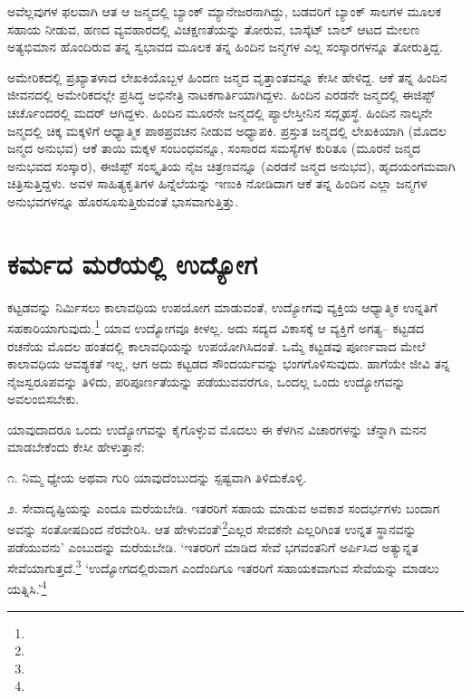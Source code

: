 ಅವೆಲ್ಲವುಗಳ ಫಲವಾಗಿ ಆತ ಆ ಜನ್ಮದಲ್ಲಿ ಬ್ಯಾಂಕ್ ಮ್ಯಾನೇಜರನಾಗಿದ್ದು, ಬಡವರಿಗೆ ಬ್ಯಾಂಕ್ ಸಾಲಗಳ ಮೂಲಕ ಸಹಾಯ ನೀಡುವ, ಹಣದ ವ್ಯವಹಾರದಲ್ಲಿ ವಿಚಕ್ಷಣತೆಯನ್ನು ತೋರುವ, ಬಾಸ್ಕೆಟ್ ಬಾಲ್ ಆಟದ ಮೇಲಣ ಅತ್ಯಭಿಮಾನ ಹೊಂದಿರುವ ತನ್ನ ಸ್ವಭಾವದ ಮೂಲಕ ತನ್ನ ಹಿಂದಿನ ಜನ್ಮಗಳ ಎಲ್ಲ ಸಂಸ್ಕಾರಗಳನ್ನೂ ತೋರುತ್ತಿದ್ದ.

ಅಮೇರಿಕದಲ್ಲಿ ಪ್ರಖ್ಯಾತಳಾದ ಲೇಖಕಿಯೊಬ್ಬಳ ಹಿಂದಣ ಜನ್ಮದ ವೃತ್ತಾಂತವನ್ನೂ ಕೇಸೀ ಹೇಳಿದ್ದ. ಆಕೆ ತನ್ನ ಹಿಂದಿನ ಜೀವನದಲ್ಲಿ ಅಮೇರಿಕದಲ್ಲೇ ಪ್ರಸಿದ್ಧ ಅಭಿನೇತ್ರಿ ನಾಟಕಗಾರ್ತಿಯಾಗಿದ್ದಳು. ಹಿಂದಿನ ಎರಡನೇ ಜನ್ಮದಲ್ಲಿ ಈಜಿಪ್ಟ್ ಚರ್ಚೊಂದರಲ್ಲಿ ಮದರ್ ಆಗಿದ್ದಳು. ಹಿಂದಿನ ಮೂರನೇ ಜನ್ಮದಲ್ಲಿ ಪ್ಯಾಲೇಸ್ತೀನಿನ ಸದ್ಗೃಹಸ್ಥೆ. ಹಿಂದಿನ ನಾಲ್ಕನೇ ಜನ್ಮದಲ್ಲಿ ಚಿಕ್ಕ ಮಕ್ಕಳಿಗೆ ಆಧ್ಯಾತ್ಮಿಕ ಪಾಠಪ್ರವಚನ ನೀಡುವ ಅಧ್ಯಾಪಕಿ. ಪ್ರಸ್ತುತ ಜನ್ಮದಲ್ಲಿ ಲೇಖಕಿಯಾಗಿ (ಮೊದಲ ಜನ್ಮದ ಅನುಭವ) ಆಕೆ ತಾಯಿ ಮಕ್ಕಳ ಸಂಬಂಧವನ್ನೂ, ಸಂಸಾರದ ಸಮಸ್ಯೆಗಳ ಕುರಿತೂ (ಮೂರನೆ ಜನ್ಮದ ಅನುಭವದ ಸಂಸ್ಕಾರ), ಈಜಿಪ್ಟ್ ಸಂಸ್ಕೃತಿಯ ನೈಜ ಚಿತ್ರಣವನ್ನೂ (ಎರಡನೆ ಜನ್ಮದ ಅನುಭವ), ಹೃದಯಂಗಮವಾಗಿ ಚಿತ್ರಿಸುತ್ತಿದ್ದಳು. ಅವಳ ಸಾಹಿತ್ಯಕೃತಿಗಳ ಹಿನ್ನೆಲೆಯನ್ನು ಇಣುಕಿ ನೋಡಿದಾಗ ಆಕೆ ತನ್ನ ಹಿಂದಿನ ಎಲ್ಲಾ ಜನ್ಮಗಳ ಅನುಭವಗಳನ್ನೂ ಹೊರಸೂಸುತ್ತಿರುವಂತೆ ಭಾಸವಾಗುತ್ತಿತ್ತು.


\section{ಕರ್ಮದ ಮರೆಯಲ್ಲಿ ಉದ್ಯೋಗ}

ಕಟ್ಟಡವನ್ನು ನಿರ್ಮಿಸಲು ಕಾಲಾವಧಿಯ  ಉಪಯೋಗ ಮಾಡುವಂತೆ, ಉದ್ಯೋಗವು ವ್ಯಕ್ತಿಯ ಆಧ್ಯಾತ್ಮಿಕ ಉನ್ನತಿಗೆ ಸಹಕಾರಿಯಾಗುವುದು.\footnote{} ಯಾವ ಉದ್ಯೋಗವೂ ಕೀಳಲ್ಲ. ಅದು ಸದ್ಯದ ವಿಕಾಸಕ್ಕೆ ಆ ವ್ಯಕ್ತಿಗೆ ಅಗತ್ಯ– ಕಟ್ಟಡದ ರಚನೆಯ ಮೊದಲ ಹಂತದಲ್ಲಿ ಕಾಲಾವಧಿಯನ್ನು ಉಪಯೋಗಿಸಿದಂತೆ. ಒಮ್ಮೆ ಕಟ್ಟಡವು ಪೂರ್ಣವಾದ ಮೇಲೆ ಕಾಲಾವಧಿಯ ಆವಶ್ಯಕತೆ ಇಲ್ಲ, ಆಗ ಅದು ಕಟ್ಟಡದ ಸೌಂದರ್ಯವನ್ನು ಭಂಗಗೊಳಿಸುವುದು. ಹಾಗೆಯೇ ಜೀವಿ ತನ್ನ ನೈಜಸ್ವರೂಪವನ್ನು ತಿಳಿದು, ಪರಿಪೂರ್ಣತೆಯನ್ನು ಪಡೆಯುವವರೆಗೂ, ಒಂದಲ್ಲ ಒಂದು ಉದ್ಯೋಗವನ್ನು ಅವಲಂಬಿಸಬೇಕು.

ಯಾವುದಾದರೂ ಒಂದು ಉದ್ಯೋಗವನ್ನು ಕೈಗೊಳ್ಳುವ ಮೊದಲು ಈ ಕೆಳಗಿನ ವಿಚಾರಗಳನ್ನು ಚೆನ್ನಾಗಿ ಮನನ ಮಾಡಬೇಕೆಂದು ಕೇಸೀ ಹೇಳುತ್ತಾನೆ:

೧. ನಿಮ್ಮ ಧ್ಯೇಯ ಅಥವಾ ಗುರಿ ಯಾವುದೆಂಬುದನ್ನು ಸ್ಪಷ್ಟವಾಗಿ ತಿಳಿದುಕೊಳ್ಳಿ.

೨. ಸೇವಾದೃಷ್ಟಿಯನ್ನು ಎಂದೂ ಮರೆಯಬೇಡಿ. ಇತರರಿಗೆ ಸಹಾಯ ಮಾಡುವ ಅವಕಾಶ ಸಂದರ್ಭಗಳು ಬಂದಾಗ ಅವನ್ನು ಸಂತೋಷದಿಂದ ನೆರವೇರಿಸಿ. ಆತ ಹೇಳುವಂತೆ‘\footnote{}ಎಲ್ಲರ ಸೇವಕನೇ ಎಲ್ಲರಿಗಿಂತ ಉನ್ನತ ಸ್ಥಾನವನ್ನು ಪಡೆಯುವನು’ ಎಂಬುದನ್ನು ಮರೆಯಬೇಡಿ. ‘ಇತರರಿಗೆ ಮಾಡಿದ ಸೇವೆ ಭಗವಂತನಿಗೆ ಅರ್ಪಿಸಿದ ಅತ್ಯುನ್ನತ ಸೇವೆಯಾಗುತ್ತದೆ.\footnote{} ‘ಉದ್ಯೋಗದಲ್ಲಿರುವಾಗ ಎಂದೆಂದಿಗೂ ಇತರರಿಗೆ ಸಹಾಯಕವಾಗುವ ಸೇವೆಯನ್ನು ಮಾಡಲು ಯತ್ನಿಸಿ.'\footnote{}

